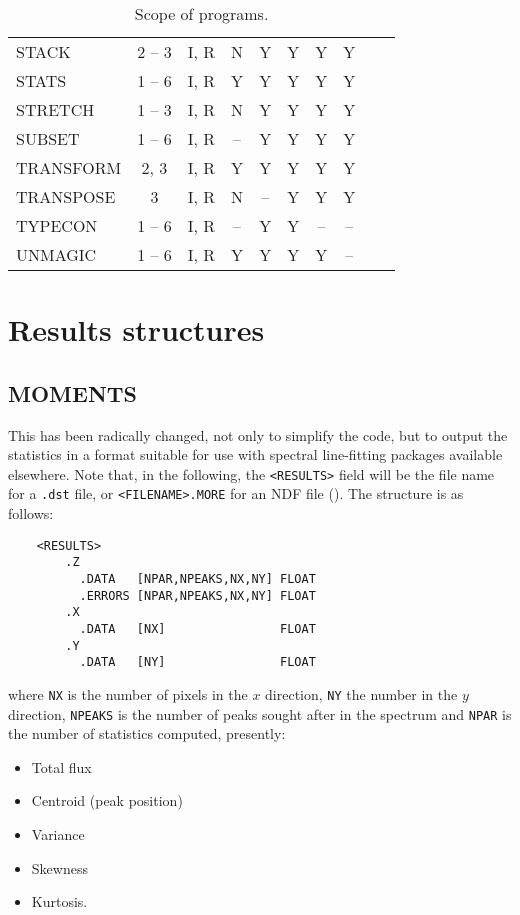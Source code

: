 {\begin{table}[ht]
\begin{center}
\begin{tabular}{|l|c|c|c|c|c|c|c|c|c|}
STACK     & 2 -- 3 & I, R & N & Y & Y & Y & Y\\
STATS     & 1 -- 6 & I, R & Y & Y & Y & Y & Y\\
STRETCH   & 1 -- 3 & I, R & N & Y & Y & Y & Y\\
SUBSET    & 1 -- 6 & I, R & -- & Y & Y & Y & Y\\
TRANSFORM & 2, 3   & I, R & Y & Y & Y & Y & Y\\
TRANSPOSE & 3      & I, R & N & -- & Y & Y & Y\\
TYPECON   & 1 -- 6 & I, R & -- & Y & Y & -- & --\\
UNMAGIC   & 1 -- 6 & I, R & Y & Y & Y & Y & --\\
\hline
\end{tabular}
\end{center}
\caption{Scope of programs.}
\end{table}
}

\clearpage

\section{Results structures{}}
\label{sec:results}

\subsection{MOMENTS}

This has been radically changed, not only to simplify the code, but to output
the statistics in a format suitable for use with spectral line-fitting packages
available elsewhere. Note that, in the following,
the {\tt <RESULTS>} field will be the file name for a {\tt .dst} file, or
{\tt <FILENAME>.MORE} for an NDF file ().
The structure is as follows:

\begin{myquote}
\begin{verbatim}
    <RESULTS> 
        .Z
          .DATA   [NPAR,NPEAKS,NX,NY] FLOAT
          .ERRORS [NPAR,NPEAKS,NX,NY] FLOAT
        .X      
          .DATA   [NX]                FLOAT
        .Y     
          .DATA   [NY]                FLOAT
\end{verbatim}
\end{myquote}

where {\tt NX} is the number of pixels in the $x$ direction, {\tt NY} the
number in the $y$ direction, {\tt NPEAKS} is the number of peaks sought
after in the spectrum and {\tt NPAR} is the number of statistics computed,
presently:
\begin{itemize}
\item Total flux
\item Centroid (peak position)
\item Variance
\item Skewness
\item Kurtosis.
\end{itemize}

